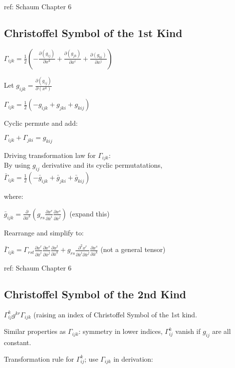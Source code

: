 \documentclass[8pt,letter]{article}
\begin{document}
\begin{multicols*}{2}
  ref: Schaum Chapter 6
  
  \subsection{Christoffel Symbol of the 1st Kind}

  $\Gamma_{ijk} = \frac{1}{2}\left( - \frac{\partial (g_{ij})}{\partial x^k} + \frac{\partial (g_{jk})}{\partial x^i} + \frac{\partial (g_{ki})}{\partial x^j} \right)$

  Let $g_{ijk}=\frac{\partial(g_{ij})}{\partial(x^k)}$

  $\Gamma_{ijk} = \frac{1}{2}( -g_{ijk} + g_{jki} + g_{kij})$

  Cyclic permute and add:

  $\Gamma_{ijk} + \Gamma_{jki} = g_{kij}$

  Driving transformation law for $\Gamma_{ijk}$:\\
  By using $g_{ij}$ derivative and its cyclic permutatations,\\
  $\bar{\Gamma}_{ijk} = \frac{1}{2}( -\bar{g}_{ijk} + \bar{g}_{jki} + \bar{g}_{kij})$

  where:
  
  $\bar{g}_{ijk} = \frac{\partial}{\partial \bar{x}^k} \left(g_{rs} \frac{\partial x^r}{\partial \bar{x}^i} \frac{\partial x^s}{\partial \bar{x}^j}\right)$ (expand this)

  Rearrange and simplify to:

  $\bar{\Gamma}_{ijk} = \Gamma_{rst} \frac{\partial x^r}{\partial \bar{x}^i} \frac{\partial x^s}{\partial \bar{x}^j} \frac{\partial x^t}{\partial \bar{x}^k} + g_{rs} \frac{\partial^2 x^r}{\partial \bar{x}^i \partial \bar{x}^j} \frac{\partial x^s}{\partial \bar{x}^k}$ (not a general tensor)

  ref: Schaum Chapter 6
  
  \subsection{Christoffel Symbol of the 2nd Kind}

  $\Gamma_{ij}^k g^{kr} \Gamma_{ijk}$ (raising an index of Christoffel Symbol of the 1st kind.

  Similar properties as $\Gamma_{ijk}$: symmetry in lower indices, $\Gamma_{ij}^k$ vanish if $g_{ij}$ are all constant.
  
  Transformation rule for $\Gamma_{ij}^k$; use $\Gamma_{ijk}$ in derivation:
  

\end{multicols*}
\end{document}
